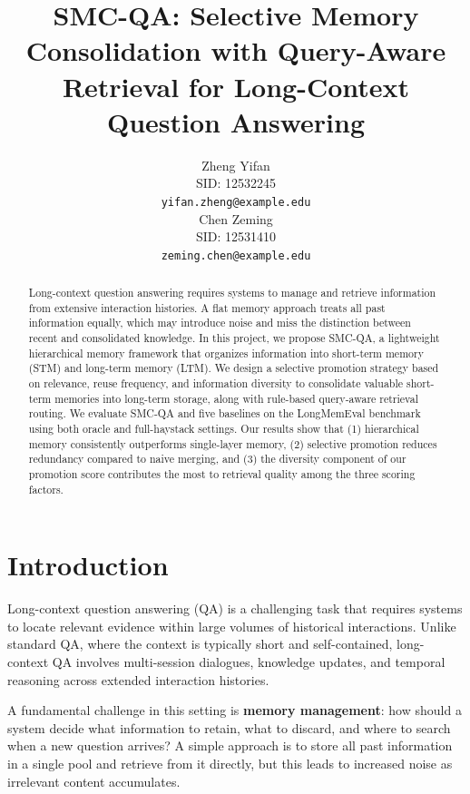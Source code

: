 \documentclass{article}
\title{SMC-QA: Selective Memory Consolidation with Query-Aware Retrieval for Long-Context Question Answering}
\author{
  Zheng Yifan \\
  SID: 12532245 \\
  \texttt{yifan.zheng@example.edu} \\
  \And
  Chen Zeming \\
  SID: 12531410 \\
  \texttt{zeming.chen@example.edu} \\
}
\begin{document}
\maketitle

\begin{abstract}
Long-context question answering requires systems to manage and retrieve information from extensive interaction histories. A flat memory approach treats all past information equally, which may introduce noise and miss the distinction between recent and consolidated knowledge. In this project, we propose SMC-QA, a lightweight hierarchical memory framework that organizes information into short-term memory (STM) and long-term memory (LTM). We design a selective promotion strategy based on relevance, reuse frequency, and information diversity to consolidate valuable short-term memories into long-term storage, along with rule-based query-aware retrieval routing. We evaluate SMC-QA and five baselines on the LongMemEval benchmark using both oracle and full-haystack settings. Our results show that (1) hierarchical memory consistently outperforms single-layer memory, (2) selective promotion reduces redundancy compared to naive merging, and (3) the diversity component of our promotion score contributes the most to retrieval quality among the three scoring factors.
\end{abstract}

\section{Introduction}

Long-context question answering (QA) is a challenging task that requires systems to locate relevant evidence within large volumes of historical interactions. Unlike standard QA, where the context is typically short and self-contained, long-context QA involves multi-session dialogues, knowledge updates, and temporal reasoning across extended interaction histories.

A fundamental challenge in this setting is \textbf{memory management}: how should a system decide what information to retain, what to discard, and where to search when a new question arrives? A simple approach is to store all past information in a single pool and retrieve from it directly, but this leads to increased noise as irrelevant content accumulates.
\end{document}
